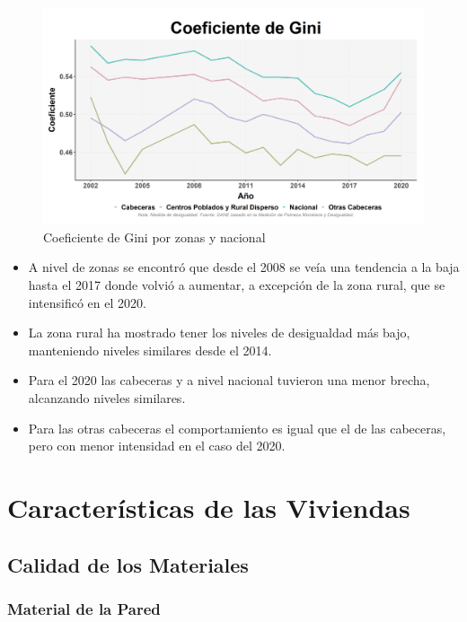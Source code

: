     \begin{figure}[H]
        \caption{Coeficiente de Gini por zonas y nacional \label{map_result_2} }
        \begin{center}
        \includegraphics[width=\textwidth,keepaspectratio]{img/var_256_trend.png}
        \end{center}
    \end{figure}
            \begin{itemize}
                    \item A nivel de zonas se encontró que desde el 2008 se veía una tendencia a la baja hasta el 2017 donde volvió a aumentar, a excepción de la zona rural, que se intensificó en el 2020.
                    \item La zona rural ha mostrado tener los niveles de desigualdad más bajo, manteniendo niveles similares desde el 2014.
                    \item Para el 2020 las cabeceras y a nivel nacional tuvieron una menor brecha, alcanzando niveles similares.
                    \item Para las otras cabeceras el comportamiento es igual que el de las cabeceras, pero con menor intensidad en el caso del 2020.
                    \end{itemize}

\section{Características de las Viviendas}
    \subsection{Calidad de los Materiales}
        \subsubsection{Material de la Pared}

